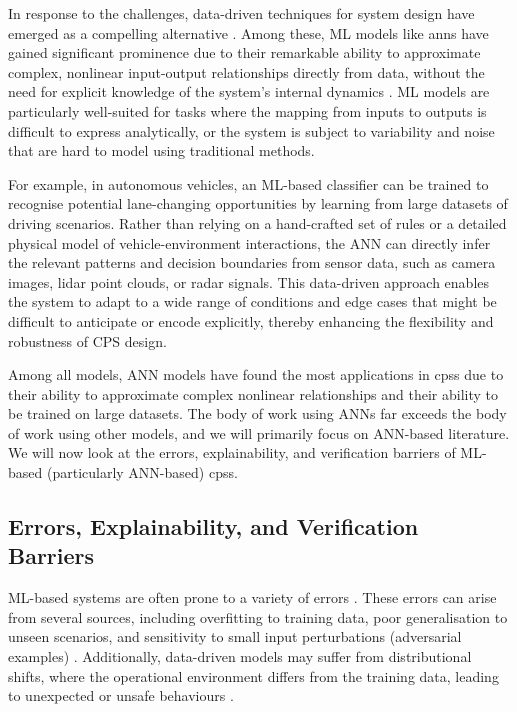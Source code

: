 In response to the challenges, data-driven techniques for system design have emerged as a compelling alternative \cite{alzubaidi_rain-aware_nodate, xing_ensemble_2020, wang_bayesian_2021}. Among these, ML models like \glspl{ann} have gained significant prominence due to their remarkable ability to approximate complex, nonlinear input-output relationships directly from data, without the need for explicit knowledge of the system's internal dynamics \cite{goodfellow_deep_2016}. ML models are particularly well-suited for tasks where the mapping from inputs to outputs is difficult to express analytically, or the system is subject to variability and noise that are hard to model using traditional methods. 

For example, in autonomous vehicles, an ML-based classifier can be trained to recognise potential lane-changing opportunities by learning from large datasets of driving scenarios. Rather than relying on a hand-crafted set of rules or a detailed physical model of vehicle-environment interactions, the ANN can directly infer the relevant patterns and decision boundaries from sensor data, such as camera images, lidar point clouds, or radar signals. This data-driven approach enables the system to adapt to a wide range of conditions and edge cases that might be difficult to anticipate or encode explicitly, thereby enhancing the flexibility and robustness of CPS design.

Among all models, ANN models have found the most applications in \glspl{cps} due to their ability to approximate complex nonlinear relationships and their ability to be trained on large datasets. The body of work using ANNs far exceeds the body of work using other models, and we will primarily focus on ANN-based literature. We will now look at the errors, explainability, and verification barriers of ML-based (particularly ANN-based) \glspl{cps}.


\subsection{Errors, Explainability, and Verification Barriers}

ML-based systems are often prone to a variety of errors \cite{huang_safety_2017}. These errors can arise from several sources, including overfitting to training data, poor generalisation to unseen scenarios, and sensitivity to small input perturbations (adversarial examples) \cite{goodfellow_explaining_2015}. Additionally, data-driven models may suffer from distributional shifts, where the operational environment differs from the training data, leading to unexpected or unsafe behaviours \cite{moreno_unifying_2012}. 

